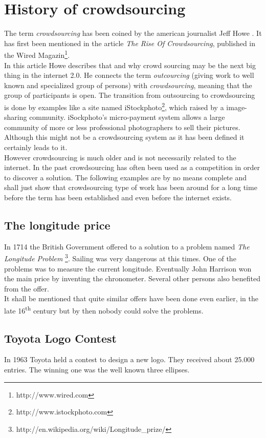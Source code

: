 \documentclass{acm_proc_article-sp}
\begin{document}
\section{History of crowdsourcing}
\label{sect:history}
The term \textit{crowdsourcing} has been coined by the american journalist Jeff Howe \cite{howe:rise}. It has first been mentioned in the article \textit{The Rise Of Crowdsourcing}, published in the Wired Magazin\footnote{http://www.wired.com}. \\
In this article Howe describes that and why crowd sourcing may be the next big thing in the internet 2.0. He connects the term \textit{outcourcing} (giving work to well known and specialized group of persons) with \textit{crowdsourcing}, meaning that the group of participants is open. The transition from outsourcing to crowdsourcing is done by examples like a site named iStockphoto\footnote{http://www.istockphoto.com}, which raised by a image-sharing community. iSockphoto's micro-payment system allows a large community of more or less professional photographers to sell their pictures. Although this might not be a crowdsourcing system as it has been defined it certainly leads to it.\\
However crowdsourcing is much older and is not necessarily related to the internet. In the past crowdsourcing has often been used as a competition in order to discover a solution. The following examples are by no means complete and shall just show that crowdsourcing type of work has been around for a long time before the term has been established and even before the internet exists.
\subsection*{The longitude price}
In 1714 the British Government offered  to a solution to a problem named \textit{The Longitude Problem} \footnote{http://en.wikipedia.org/wiki/Longitude\_prize/}. Sailing was very dangerous at this times. One of the problems was to measure the current longitude. Eventually John Harrison won the main price by inventing the chronometer. Several other persons also benefited from the offer.\\
It shall be mentioned that quite similar offers have been done even earlier, in the late 16\textsuperscript{th} century but by then nobody could solve the problems.
\subsection*{Toyota Logo Contest}
In 1963 Toyota held a contest to design a new logo. They received about 25.000 entries. The winning one was the well known three ellipses.
\end{document}

